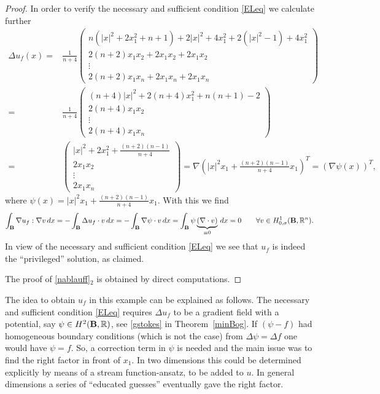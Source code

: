 \documentclass[11pt]{article}
\theoremstyle{plain}
\theoremstyle{definition}
\numberwithin{equation}{section}
\newcommand{\R}{\mathbb{R}}
\newcommand{\B}{{\bf B}}
\begin{document}
\begin{appendix}
\begin{proof}
	In order to verify 	the necessary and sufficient condition \eqref{ELeq} we calculate further
	\begin{align*}
		\Delta u_f(x) =&\frac{1}{n+4}
		\begin{pmatrix}
			n\left( |x|^2+2x_1^2+n+1\right)+2|x|^2+4x_1^2  + 2 (|x|^2-1) +4x_1^2\\
			2(n+2)x_1x_2  +	2x_1 x_2   +	2x_1 x_2 \\
			\vdots \\
			2(n+2)x_1x_n  +	2x_1 x_n  +	2x_1 x_n
		\end{pmatrix}\\
		=&\frac{1}{n+4}
		\begin{pmatrix}
			(n+4) |x|^2+  2(n+4) x_1^2+ n(n+1)-2\\
			2(n+4)x_1x_2 \\
			\vdots \\
			2(n+4)x_1x_n
		\end{pmatrix}\\
		=&
		\begin{pmatrix}
			|x|^2+  2x_1^2+ \frac{(n+2)(n-1)}{n+4}\\
			2x_1x_2 \\
			\vdots \\
			2x_1x_n
		\end{pmatrix}
		=\nabla  \left(  |x|^2x_1 +  \frac{(n+2)(n-1)}{n+4}x_1\right)^T
		=(\nabla \psi(x))^T,
	\end{align*}
	where $\psi(x)=|x|^2x_1+\frac{(n+2)(n-1)}{n+4}x_1$. With this we find
	$$
	\int_\B \nabla u_f : \nabla v\, dx=-\int_\B\Delta u_f \cdot v\, dx
	=-\int_\B\nabla \psi  \cdot v\, dx=\int_\B\psi \underbrace{(\nabla \cdot v)}_{\equiv 0}\, dx=0\qquad
	\forall v\in H^1_{0,\sigma}(\B,\R^n).
	$$
	In view of the necessary and sufficient condition \eqref{ELeq} we see that $u_f$ is indeed the ``privileged'' solution, as claimed.\par
	The proof of \eqref{nablauff}$_2$ is obtained by direct computations.\end{proof}

The idea to obtain $u_f$ in this example can be explained as follows. The necessary and sufficient condition \eqref{ELeq} requires
$\Delta u_f$  to be a gradient field with a potential, say $\psi\in H^2(\B,\R)$, see \eqref{gstokes} in Theorem~\ref{minBog}. If $(\psi-f)$ had
homogeneous boundary conditions (which is not the case) from $\Delta \psi =\Delta f$ one would have
$\psi=f$. So, a correction term in $\psi$ is needed and the main issue was to find the right factor in front of $x_1$.
In two dimensions this could be determined explicitly by means of a stream function-ansatz, to be added to $u$. In general dimensions a series of ``educated guesses'' eventually gave the right factor.


\end{appendix}
\end{document}
